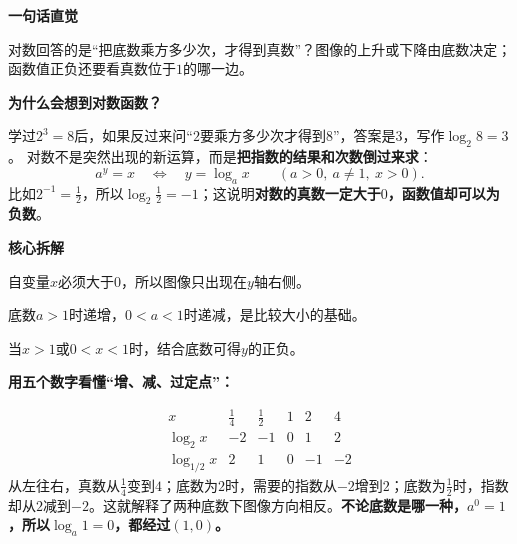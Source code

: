 \clearpage
\begin{explanationbox}

	\textbf{\textcolor{CExplanation}{一句话直觉}}

	对数回答的是“把底数乘方多少次，才得到真数”？图像的上升或下降由底数决定；函数值正负还要看真数位于$1$的哪一边。

	\medskip
	

\textbf{\textcolor{CExplanation}{为什么会想到对数函数？}}



学过$2^3=8$后，如果反过来问“$2$要乘方多少次才得到$8$”，答案是$3$，写作$\log_2 8=3$。
对数不是突然出现的新运算，而是\textbf{把指数的结果和次数倒过来求}：
\[
  a^y=x\quad\Longleftrightarrow\quad y=\log_a x
  \qquad(a>0,\ a\ne1,\ x>0).
\]
比如$2^{-1}=\tfrac12$，所以$\log_2\tfrac12=-1$；这说明\textbf{对数的真数一定大于$0$，函数值却可以为负数}。

\medskip

\end{explanationbox}
\clearpage
\begin{explanationbox}
\textbf{\textcolor{CExplanation}{核心拆解}}


	\begin{description}[style=nextline, leftmargin=2.8em, labelsep=0.5em, itemsep=0.45em]
		\item[\textbf{要点一（定义域限制）：}] 自变量$x$必须大于$0$，所以图像只出现在$y$轴右侧。
		\item[\textbf{要点二（单调性条件）：}] 底数$a>1$时递增，$0<a<1$时递减，是比较大小的基础。
		\item[\textbf{要点三（符号法则）：}] 当$x>1$或$0<x<1$时，结合底数可得$y$的正负。
	\end{description}

	\medskip
	
\end{explanationbox}
\clearpage
\begin{explanationbox}
\textbf{\textcolor{CExplanation}{用五个数字看懂“增、减、过定点”：}}


\[
\begin{array}{c|ccccc}
  x & \tfrac14 & \tfrac12 & 1 & 2 & 4\\ \hline
  \log_2 x & -2 & -1 & 0 & 1 & 2\\
  \log_{1/2}x & 2 & 1 & 0 & -1 & -2
\end{array}
\]
从左往右，真数从$\tfrac14$变到$4$；底数为$2$时，需要的指数从$-2$增到$2$；底数为$\tfrac12$时，指数却从$2$减到$-2$。这就解释了两种底数下图像方向相反。\textbf{不论底数是哪一种，$a^0=1$，所以$\log_a1=0$，都经过$(1,0)$。}

\medskip

\end{explanationbox}
